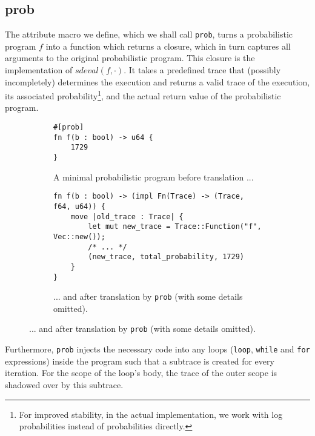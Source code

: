 \subsection{prob}

The attribute macro we define, which we shall call \lstinline{prob}, turns a probabilistic program $f$ into a function which returns a closure, which in turn captures all arguments to the original probabilistic program. This closure is the implementation of $sdeval(f,\cdot)$. It takes a predefined trace that (possibly incompletely) determines the execution and returns a valid trace of the execution, its associated probability\footnote{For improved stability, in the actual implementation, we work with log probabilities instead of probabilities directly.}, and the actual return value of the probabilistic program.

\begin{figure}[H]
\begin{subfigure}{\textwidth}
\begin{lstlisting}
#[prob]
fn f(b : bool) -> u64 {
    1729
}
\end{lstlisting}
\caption{A minimal probabilistic program before translation ...}
\end{subfigure}

\begin{subfigure}{\textwidth}
\begin{lstlisting}
fn f(b : bool) -> (impl Fn(Trace) -> (Trace, f64, u64)) {
    move |old_trace : Trace| {
        let mut new_trace = Trace::Function("f", Vec::new());
        /* ... */
        (new_trace, total_probability, 1729)
    }
}
\end{lstlisting}
\caption{... and after translation by \lstinline{prob} (with some details omitted).}
\end{subfigure}
\end{figure}

Furthermore, \lstinline{prob} injects the necessary code into any loops (\lstinline{loop}, \lstinline{while} and \lstinline{for} expressions) inside the program such that a subtrace is created for every iteration. For the scope of the loop's body, the trace of the outer scope is shadowed over by this subtrace.


